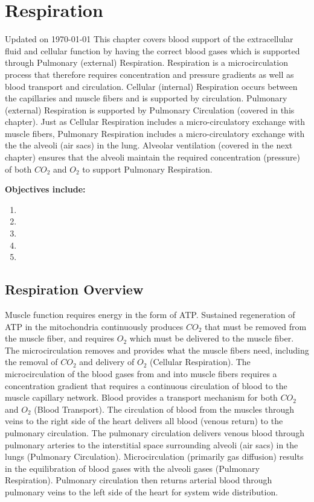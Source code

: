 \chapter{Respiration}\label{chp:blood_oxygen}
Updated on \today
\minitoc
This chapter covers blood support of the extracellular fluid and cellular function by having the correct blood gases which is supported through Pulmonary (external) Respiration. Respiration is a microcirculation process that therefore requires concentration and pressure gradients as well as blood transport and circulation. Cellular (internal) Respiration occurs between the capillaries and muscle fibers and is supported by circulation. Pulmonary (external) Respiration is supported by Pulmonary Circulation (covered in this chapter). Just as Cellular Respiration includes a micro-circulatory exchange with muscle fibers, Pulmonary Respiration includes a micro-circulatory exchange with the the alveoli (air sacs) in the lung. Alveolar ventilation (covered in the next chapter) ensures that the alveoli maintain the required concentration (pressure) of both $CO_2$ and $O_2$ to support Pulmonary Respiration.

\vspace{5mm}

\textbf{Objectives include:}
\begin{enumerate}
    \item
    \item
    \item
    \item
    \item
\end{enumerate}

\section{Respiration Overview}
Muscle function requires energy in the form of ATP. Sustained regeneration of ATP in the mitochondria continuously produces $CO_2$ that must be removed from the muscle fiber, and requires $O_2$ which must be delivered to the muscle fiber. The microcirculation removes and provides what the muscle fibers need, including the removal of $CO_2$ and delivery of $O_2$ (Cellular Respiration). The microcirculation of the blood gases from and into muscle fibers requires a concentration gradient that requires a continuous circulation of blood to the muscle capillary network. Blood provides a transport mechanism for both $CO_2$ and $O_2$ (Blood Transport). The circulation of blood from the muscles through veins to the right side of the heart delivers all blood (venous return) to the pulmonary circulation. The pulmonary circulation delivers venous blood through pulmonary arteries to the interstitial space surrounding alveoli (air sacs) in the lungs (Pulmonary Circulation). Microcirculation (primarily gas diffusion) results in the equilibration of blood gases with the alveoli gases (Pulmonary Respiration). Pulmonary circulation then returns arterial blood through pulmonary veins to the left side of the heart for system wide distribution.


